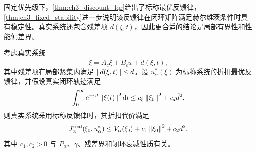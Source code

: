 固定优先级下，\cref{thm:ch3_discount_lqr}给出了标称最优反馈律，\cref{thm:ch3_fixed_stability}进一步说明该反馈律在闭环矩阵满足赫尔维茨条件时具有稳定性。真实系统还包含残差项 $d(\xi,t)$，因此更合适的结论是局部有界性和性能偏差界。

\begin{theorem}[残差项影响下的实际性能上界]
\label{thm:ch3_residual_performance}
考虑真实系统
\begin{equation}
  \dot\xi=A_c\xi+B_cu+d(\xi,t),
  \label{eq:ch3_real_system}
\end{equation}
其中残差项在局部紧集内满足 $\left\lVert d(\xi,t)\right\rVert\le\bar d$。设 $u_\alpha^*(\xi)$ 为标称系统的折扣最优反馈律，并假设真实闭环轨迹满足
\begin{equation}
  \int_0^\infty \mathrm{e}^{-\gamma t}\left\lVert \xi(t)\right\rVert^2\mathrm{d} t\le c_\xi\left\lVert \xi_0\right\rVert^2+c_d\bar d^2 .
  \label{eq:ch3_state_energy_bound}
\end{equation}
则真实系统采用标称反馈律时，其折扣代价满足
\begin{equation}
  J_\alpha^{\mathrm{real}}(\xi_0,u_\alpha^*)\le V_\alpha(\xi_0)+c_1\left\lVert \xi_0\right\rVert^2+c_2\bar d^2,
  \label{eq:ch3_real_cost_bound}
\end{equation}
其中 $c_1,c_2>0$ 与 $P_\alpha$、$\gamma$、残差界和闭环衰减性质有关。
\end{theorem}

